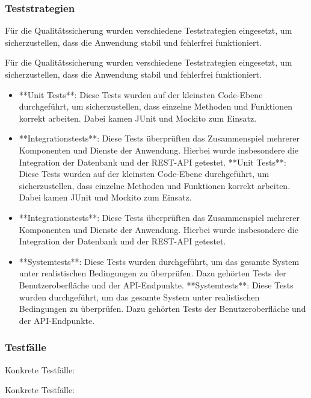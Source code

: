 \subsubsection{Teststrategien}\label{teststrategien}

Für die Qualitätssicherung wurden verschiedene Teststrategien eingesetzt, um sicherzustellen, dass die Anwendung stabil und fehlerfrei funktioniert.

Für die Qualitätssicherung wurden verschiedene Teststrategien eingesetzt, um sicherzustellen, dass die Anwendung stabil und fehlerfrei funktioniert.

\begin{itemize}
  \item
        **Unit Tests**: Diese Tests wurden auf der kleinsten Code-Ebene durchgeführt, um sicherzustellen, dass einzelne Methoden und Funktionen korrekt arbeiten. Dabei kamen JUnit und Mockito zum Einsatz.
  \item
        **Integrationstests**: Diese Tests überprüften das Zusammenspiel mehrerer Komponenten und Dienste der Anwendung. Hierbei wurde insbesondere die Integration der Datenbank und der REST-API getestet.
        **Unit Tests**: Diese Tests wurden auf der kleinsten Code-Ebene durchgeführt, um sicherzustellen, dass einzelne Methoden und Funktionen korrekt arbeiten. Dabei kamen JUnit und Mockito zum Einsatz.
  \item
        **Integrationstests**: Diese Tests überprüften das Zusammenspiel mehrerer Komponenten und Dienste der Anwendung. Hierbei wurde insbesondere die Integration der Datenbank und der REST-API getestet.
  \item
        **Systemtests**: Diese Tests wurden durchgeführt, um das gesamte System unter realistischen Bedingungen zu überprüfen. Dazu gehörten Tests der Benutzeroberfläche und der API-Endpunkte.
        **Systemtests**: Diese Tests wurden durchgeführt, um das gesamte System unter realistischen Bedingungen zu überprüfen. Dazu gehörten Tests der Benutzeroberfläche und der API-Endpunkte.
\end{itemize}

\subsubsection{Testfälle}\label{testfuxe4lle}

Konkrete Testfälle:

Konkrete Testfälle:

